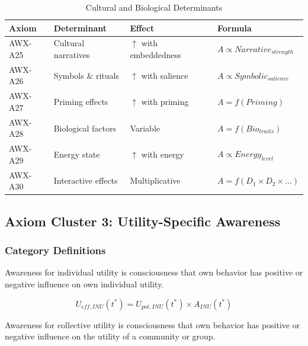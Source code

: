 \begin{table}[htbp]
\centering
\caption{Cultural and Biological Determinants}
\label{tab:cultural-biological}
\renewcommand{\arraystretch}{1.3}
\begin{tabular}{@{}llll@{}}
\toprule
\textbf{Axiom} & \textbf{Determinant} & \textbf{Effect} & \textbf{Formula} \\
\midrule
AWX-A25 & Cultural narratives & $\uparrow$ with embeddedness & $A \propto Narrative_{strength}$ \\
AWX-A26 & Symbols \& rituals & $\uparrow$ with salience & $A \propto Symbolic_{salience}$ \\
AWX-A27 & Priming effects & $\uparrow$ with priming & $A = f(Priming)$ \\
AWX-A28 & Biological factors & Variable & $A = f(Bio_{traits})$ \\
AWX-A29 & Energy state & $\uparrow$ with energy & $A \propto Energy_{level}$ \\
AWX-A30 & Interactive effects & Multiplicative & $A = f(D_1 \times D_2 \times \ldots)$ \\
\bottomrule
\end{tabular}
\end{table}

\subsection{Axiom Cluster 3: Utility-Specific Awareness}
\label{subsec:axioms-utility-specific}

\subsubsection{Category Definitions}

\begin{axiom}
\label{ax:awx-a31}
Awareness for individual utility is consciousness that own behavior has 
positive or negative influence on own individual utility.
\end{axiom}

\begin{equation}
U_{eff,INU}(t^*) = U_{pot,INU}(t^*) \times A_{INU}(t^*)
\end{equation}

\begin{axiom}
\label{ax:awx-a32}
Awareness for collective utility is consciousness that own behavior has 
positive or negative influence on the utility of a community or group.
\end{axiom}

